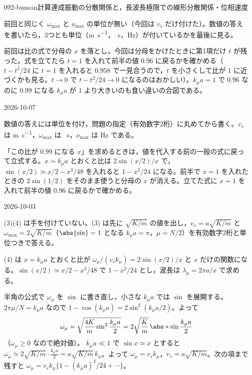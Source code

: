 \documentclass[uplatex,dvipdfmx,a4paper,11pt]{jsarticle}
\begin{document}
\begin{mondai}{092-bunsan}{計算}{連成振動の分散関係と，長波長極限での線形分散関係・位相速度}
\begin{kizuki}
\item {} 前回と同じく $\omega_{\max}$ と $\nu_{\max}$ の単位が無い（今回は $v_s$ だけ付けた）。数値の答えを書いたら，3つとも単位（\unit{\metre\per\second}，\unit{\per\second}，\unit{\hertz}）が付いているかを最後に見る。
\item {} 前回は比の式で分母の $x$ を落とし，今回は分母をかけたときに第1項だけ $t$ が残った。式を立てたら $t=1$ を入れて前半の値 $0.96$ に戻るかを確かめる（$t-t^{2}/24$ に $t=1$ を入れると $0.958$ で一見合うので，$t$ を小さくして比が 1 に近づくかも見る。$t\to0$ で $t-t^{2}/24\to0$ になるのはおかしい）。$k_\mu a=1$ で $0.96$ なのに $0.99$ になる $k_\mu a$ が 1 より大きいのも食い違いの合図である。
\end{kizuki}
\begin{maekizuki}{2026-10-07}
\item 数値の答えには単位を付け，問題の指定（有効数字2桁）に丸めてから書く。$v_s$ は \unit{\metre\per\second}，$\omega_{\max}$ は \unit{\per\second}，$\nu_{\max}$ は \unit{\hertz} である。
\item 「この比が $0.99$ になる $x$」を求めるときは，値を代入する前の一般の式に戻って立式する。$x=k_\mu a$ とおくと比は $2\sin(x/2)/x$ で，$\sin(x/2)\simeq x/2-x^{3}/48$ を入れると $1-x^{2}/24$ になる。前半で $x=1$ を入れたときの $2\sin(1/2)$ をそのまま使うと分母の $x$ が消える。立てた式に $x=1$ を入れて前半の値 $0.96$ に戻るかで確かめる。
\end{maekizuki}
\begin{maekizuki}{2026-10-03}
\item (3)(4) は手を付けていない。(3) は先に $\sqrt{K/m}$ の値を出し，$v_s=a\sqrt{K/m}$ と $\omega_{\max}=2\sqrt{K/m}$（$\abs{\sin}=1$ となる $k_\mu a=\pi$，$\mu=N/2$）を有効数字2桁と単位つきで答える。
\item (4) は $x=k_\mu a$ とおくと比が $\omega_\mu/(v_sk_\mu)=2\sin(x/2)/x$ と $x$ だけの関数になる。$\sin(x/2)\simeq x/2-x^{3}/48$ で $1-x^{2}/24$ とし，波長は $\lambda_\mu=2\pi a/x$ で求める。
\end{maekizuki}
\begin{tadashii}
\houshin 半角の公式で $\omega_\mu$ を $\sin$ に書き直し，小さな $k_\mu a$ では $\sin$ を展開する。
\keisan
{} $2\pi\mu/N=k_\mu a$ なので $1-\cos(k_\mu a)=2\sin^{2}(k_\mu a/2)$。よって
\[ \omega_\mu=\sqrt{\frac{4K}{m}\sin^{2}\frac{k_\mu a}{2}}=2\sqrt{\frac{K}{m}}\,\abs*{\sin\frac{k_\mu a}{2}} \]
（$\omega_\mu\ge0$ なので絶対値）。
 $k_\mu a\ll1$ で $\sin x\simeq x$ とすると $\omega_\mu\simeq2\sqrt{K/m}\cdot\frac{k_\mu a}{2}=a\sqrt{K/m}\,k_\mu$。よって $\omega_\mu=v_sk_\mu$，$v_s=a\sqrt{K/m}$。次の項まで残すと $\omega_\mu=v_sk_\mu\{1-(k_\mu a)^{2}/24+\cdots\}$。

\end{tadashii}
\end{mondai}
\end{document}
